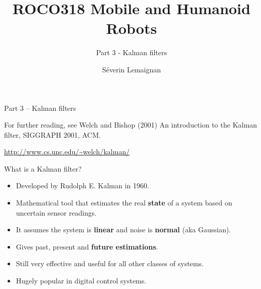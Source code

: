 \documentclass[compress]{beamer}
\title{ROCO318 \newline Mobile and Humanoid Robots}
\subtitle{Part 3 - Kalman filters}
\date{}
\author{Séverin Lemaignan}
\institute{Centre for Neural Systems and Robotics\\{\bf Plymouth University}}
\begin{document}

\maketitle

\begin{frame}{Part 3 -- Kalman filters}

    For further reading, see Welch and Bishop (2001) An introduction to the
    Kalman filter, SIGGRAPH 2001, ACM.

    \url{http://www.cs.unc.edu/~welch/kalman/}


\end{frame}

\begin{frame}{What is a Kalman filter?}

    \begin{itemize}
        \item Developed by Rudolph E. Kalman in 1960.
        \item Mathematical tool that estimates the real
            \textbf{state} of a system based on uncertain
            sensor readings.
        \item It assumes the system is \textbf{linear} and noise is
            \textbf{normal} (aka Gaussian).
        \item Gives past, present and \textbf{future estimations}.
        \item Still very effective and useful for all other classes of systems.
        \item Hugely popular in digital control systems.
    \end{itemize}


\end{frame}
\end{document}
